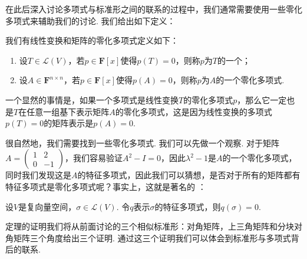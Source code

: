 在此后深入讨论多项式与标准形之间的联系的过程中，我们通常需要使用一些零化多项式来辅助我们的讨论. 我们给出如下定义：
\begin{definition}[零化多项式] 
    我们有线性变换和矩阵的零化多项式定义如下：
    \begin{enumerate}
        \item 设$T\in \mathcal{L}(V)$，若$p\in\mathbf{F}[x]$使得$p(T)=0$，则称$p$为$T$的一个；

        \item 设$A\in\mathbf{F}^{n\times n}$，若$p\in\mathbf{F}[x]$使得$p(A)=0$，则称$p$为$A$的一个零化多项式.
    \end{enumerate}
\end{definition}

一个显然的事情是，如果一个多项式是线性变换$T$的零化多项式$p$，那么它一定也是$T$在任意一组基下表示矩阵$A$的零化多项式，这是因为线性变换的多项式$p(T)=0$的矩阵表示是$p(A)=0$.

很自然地，我们需要找到一些零化多项式. 我们可以先做一个观察. 对于矩阵$A=\begin{pmatrix}
    1 & 2 \\ 0 & -1
\end{pmatrix}$，我们容易验证$A^2-I=0$，因此$\lambda^2-1$是$A$的一个零化多项式，同时我们发现这是$A$的特征多项式，因此我们可以猜想，是否对于所有的矩阵都有特征多项式是零化多项式呢？事实上，这就是著名的 ：
\begin{theorem} \label{thm:18:HC} 
    设$V$是复向量空间，$\sigma\in \mathcal{L}(V)$. 令$q$表示$\sigma$的特征多项式，则$q(\sigma)=0$.
\end{theorem}
定理的证明我们将从前面讨论的三个相似标准形：对角矩阵，上三角矩阵和分块对角矩阵三个角度给出三个证明. 通过这三个证明我们可以体会到标准形与多项式背后的联系.

